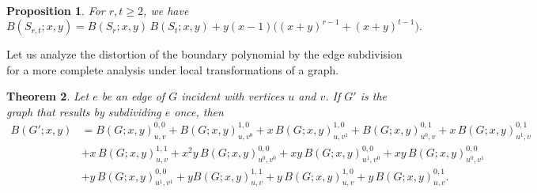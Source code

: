\documentclass[review]{elsarticle}
\newtheorem{theorem}{Theorem}[section]
\newtheorem{proposition}[theorem]{Proposition}
\begin{document}



\begin{proposition}\label{p:S_rt}
For $r,t\geq 2$, we have
\[
B(S_{r,t}; x,y) = B(S_r; x,y)\, B(S_t; x,y) + y(x-1)\Big( (x+y)^{r-1} + (x+y)^{t-1} \Big).
\]
\end{proposition}



Let us analyze the distortion of the boundary polynomial by the edge subdivision for a more complete analysis under local transformations of a graph.

\begin{theorem}
Let $e$ be an edge of $G$ incident with vertices $u$ and $v$. If $G'$ is the graph that results by subdividing  $e$ once, then
\begin{equation}
\begin{aligned}
\nonumber
B(G';x,y) & = B(G;x,y)^{0,0}_{u,v}+B(G;x,y)^{1,0}_{u,v^{0}}+x\,B(G;x,y)^{1,0}_{u,v^{1}}
+ B(G;x,y)^{0,1}_{u^{0},v}+x\,B(G;x,y)^{0,1}_{u^{1},v}\\
           &+x\,B(G;x,y)^{1,1}_{u,v}+x^{2}y\,B(G;x,y)^{0,0}_{u^{0},v^{0}}+xy\,B(G;x,y)^{0,0}_{u^{1},v^{0}}+
xy\,B(G;x,y)^{0,0}_{u^{0},v^{1}}\\
           & +y\,B(G;x,y)^{0,0}_{u^{1},v^{1}}+yB(G;x,y)^{1,1}_{u,v}+
y\,B(G;x,y)^{1,0}_{u,v}+y\,B(G;x,y)^{0,1}_{u,v}.
\end{aligned}
\end{equation}
\end{theorem}
\end{document}
